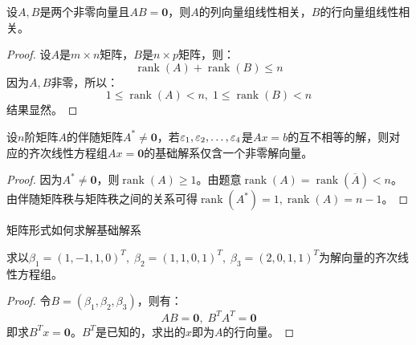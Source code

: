 \begin{theorem}
	设$A,B$是两个非零向量且$AB=\mathbf{0}$，则$A$的列向量组线性相关，$B$的行向量组线性相关。
\end{theorem}
\begin{proof}
	设$A$是$m\times n$矩阵，$B$是$n\times p$矩阵，则：
	\begin{equation*}
		\operatorname{rank}(A)+\operatorname{rank}(B)\leqslant n
	\end{equation*}
	因为$A,B$非零，所以：
	\begin{equation*}
		1\leqslant\operatorname{rank}(A)<n,\;1\leqslant\operatorname{rank}(B)<n
	\end{equation*}
	结果显然。
\end{proof}
\begin{theorem}
	设$n$阶矩阵$A$的伴随矩阵$A^*\ne\mathbf{0}$，若$\varepsilon_1, \varepsilon_2, \dots, \varepsilon_{4}$是$Ax=b$的互不相等的解，则对应的齐次线性方程组$Ax=\mathbf{0}$的基础解系仅含一个非零解向量。
\end{theorem}
\begin{proof}
	因为$A^*\ne\mathbf{0}$，则$\operatorname{rank}(A)\geqslant1$。由题意$\operatorname{rank}(A)=\operatorname{rank}(\overline{A})<n$。由伴随矩阵秩与矩阵秩之间的关系可得$\operatorname{rank}(A^*)=1,\operatorname{rank}(A)=n-1$。
\end{proof}


矩阵形式如何求解基础解系

\begin{theorem}
	求以$\beta_1=(1,-1,1,0)^T,\;\beta_2=(1,1,0,1)^T,\;\beta_3=(2,0,1,1)^T$为解向量的齐次线性方程组。
\end{theorem}
\begin{proof}
	令$B=(\beta_1,\beta_2,\beta_3)$，则有：
	\begin{equation*}
		AB=\mathbf{0},\;B^TA^T=\mathbf{0}
	\end{equation*}
	即求$B^Tx=\mathbf{0}$。$B^T$是已知的，求出的$x$即为$A$的行向量。
\end{proof}

